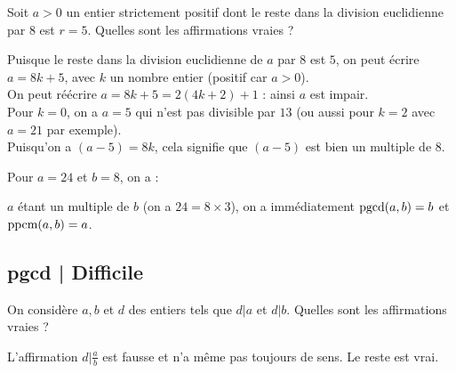 \begin{question}
    Soit $a>0$ un entier strictement positif dont le reste dans la division euclidienne par $8$ est $r=5$. Quelles sont les affirmations vraies ?
    \begin{answers} 
    \end{answers}
    \begin{explanations} 
     Puisque le reste dans la division euclidienne de $a$ par $8$ est $5$, on peut écrire $ a = 8k + 5 $, avec $k$ un nombre entier (positif car $a > 0$).\\
     On peut réécrire $a = 8k+5 = 2(4k+2) + 1$ : ainsi $a$ est impair.\\
     Pour $k=0$, on a $a=5$ qui n'est pas divisible par $13$ (ou aussi pour $k=2$ avec $a = 21$ par exemple).\\
     Puisqu'on a $(a-5) = 8k$, cela signifie que $(a-5)$ est bien un multiple de $8$.
    \end{explanations}
\end{question}


\begin{question}
    Pour $a=24$ et $b=8$, on a :
    \begin{answers} 
    \end{answers}
    \begin{explanations}   
     $a$ étant un multiple de $b$ (on a $24 = 8 \times 3$), on a immédiatement $\mathop{\text{pgcd}}(a,b) = b$ et $\mathop{\text{ppcm}}(a,b) = a$.
    \end{explanations}
\end{question}



\subsection{pgcd | Difficile}

\begin{question}
    On considère $a,b$ et $d$ des entiers tels que $d | a$ et $d | b$.
    Quelles sont les affirmations vraies ?
    \begin{answers} 
    \end{answers}
    \begin{explanations}
        L'affirmation $d | \frac{a}{b}$ est fausse et n'a même pas toujours de sens. Le reste est vrai.
    \end{explanations}
\end{question}


